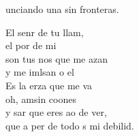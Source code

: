 \begin{cancion}
	unciando una sin fronteras. \jump\\
	\begin{chorus}%
		El senr de tu llam,\\
		el por de mi \\
		son tus nos que me azan\\
		y me imlsan o el  \\
		Es la erza que me va\\
		oh,  amsin coones\\
		y sar que eres ao de ver,\\
		que a per de todo s mi debilid.\jump\\
	\end{chorus}%
	\jump
	\jump
\end{cancion}%
